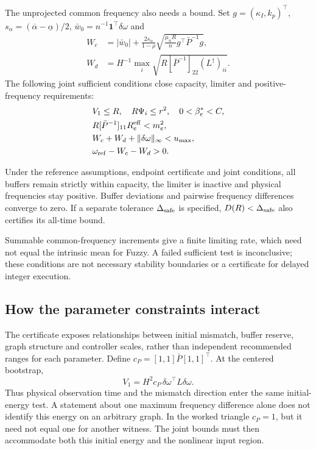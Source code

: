 The unprojected common frequency also needs a bound. Set
$g=(\kappa_I,k_p)^\top$,
$s_\alpha=(\overline\alpha-\underline\alpha)/2$,
$\bar w_0=n^{-1}\mathbf1^\top\delta\omega$ and
\begin{align}
 W_c&=|\bar w_0|+\frac{2s_\alpha}{1-\rho}
       \sqrt{\frac{\mu_nR}{n}g^\top\bar P^{-1}g},\nonumber\\
 W_d&=H^{-1}\max_i\sqrt{R[\bar P^{-1}]_{22}(L^\dagger)_{ii}}.
\end{align}
The following joint sufficient conditions close capacity, limiter
and positive-frequency requirements:
\begin{align}
 &V_1\le R,\quad R\Psi_i\le r^2,\quad 0<\beta_e^*<C,\nonumber\\
 &R[\bar P^{-1}]_{11}R_e^{\rm eff}<m_e^2,\nonumber\\
 &W_c+W_d+\|\delta\omega\|_\infty<u_{\max},\nonumber\\
 &\omega_{\rm ref}-W_c-W_d>0.
 \label{eq:btd_joint_sufficient_conditions}
\end{align}
\begin{btdcorollary}
\label{cor:btd_buffer_safety}
Under the reference assumptions, endpoint certificate and joint
conditions, all buffers remain strictly within capacity, the limiter
is inactive and physical frequencies stay positive. Buffer deviations
and pairwise frequency differences converge to zero. If a separate
tolerance $\Delta_{\rm safe}$ is specified, $D(R)<\Delta_{\rm safe}$
also certifies its all-time bound.
\end{btdcorollary}
Summable common-frequency increments give a finite limiting rate,
which need not equal the intrinsic mean for Fuzzy. A failed sufficient
test is inconclusive; these conditions are not necessary stability
boundaries or a certificate for delayed integer execution.

\subsection{How the parameter constraints interact}
The certificate exposes relationships between initial mismatch,
buffer reserve, graph structure and controller scales, rather than
independent recommended ranges for each parameter. Define
$c_P=[1,1]\bar P[1,1]^\top$. At the centered bootstrap,
\begin{equation}
 V_1=H^2c_P\,\delta\omega^\top L\delta\omega.
\end{equation}
Thus physical observation time and the mismatch direction enter the
same initial-energy test. A statement about one maximum frequency
difference alone does not identify this energy on an arbitrary graph.
In the worked triangle $c_P=1$, but it need not equal one for another
witness. The joint bounds must then accommodate both this initial
energy and the nonlinear input region.

